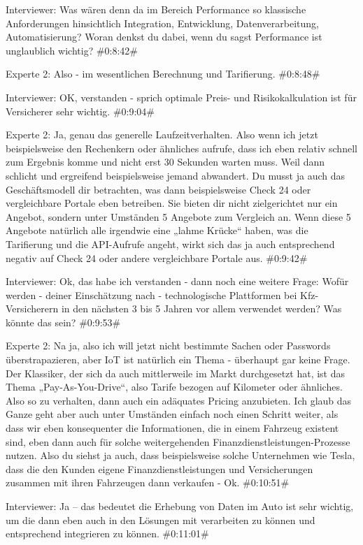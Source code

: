 Interviewer:
Was wären denn da im Bereich Performance so klassische Anforderungen hinsichtlich Integration, Entwicklung, Datenverarbeitung, Automatisierung? Woran denkst du dabei, wenn du sagst Performance ist unglaublich wichtig?
\#0:8:42\#

Experte 2:
Also - im wesentlichen Berechnung und Tarifierung.
\#0:8:48\#

Interviewer:
OK, verstanden - sprich optimale Preis- und Risikokalkulation ist für Versicherer sehr wichtig.
\#0:9:04\#

Experte 2:
Ja, genau das generelle Laufzeitverhalten. Also wenn ich jetzt beispielsweise den Rechenkern oder ähnliches aufrufe, dass ich eben relativ schnell zum Ergebnis komme und nicht erst 30 Sekunden warten muss. Weil dann schlicht und ergreifend beispielsweise jemand abwandert. Du musst ja auch das Geschäftsmodell dir betrachten, was dann beispielsweise Check 24 oder vergleichbare Portale eben betreiben. Sie bieten dir nicht zielgerichtet nur ein Angebot, sondern unter Umständen 5 Angebote zum Vergleich an. Wenn diese 5 Angebote natürlich alle irgendwie eine „lahme Krücke“ haben, was die Tarifierung und die API-Aufrufe angeht, wirkt sich das ja auch entsprechend negativ auf Check 24 oder andere vergleichbare Portale aus.
\#0:9:42\#

Interviewer:
Ok, das habe ich verstanden - dann noch eine weitere Frage: Wofür werden - deiner Einschätzung nach - technologische Plattformen bei Kfz-Versicherern in den nächsten 3 bis 5 Jahren vor allem verwendet werden? Was könnte das sein?
\#0:9:53\#

Experte 2:
Na ja, also ich will jetzt nicht bestimmte Sachen oder Passwords überstrapazieren, aber IoT ist natürlich ein Thema - überhaupt gar keine Frage. Der Klassiker, der sich da auch mittlerweile im Markt durchgesetzt hat, ist das Thema „Pay-As-You-Drive“, also Tarife bezogen auf Kilometer oder ähnliches. Also so zu verhalten, dann auch ein adäquates Pricing anzubieten. Ich glaub das Ganze geht aber auch unter Umständen einfach noch einen Schritt weiter, als dass wir eben konsequenter die Informationen, die in einem Fahrzeug existent sind, eben dann auch für solche weitergehenden Finanzdienstleistungen-Prozesse nutzen. Also du siehst ja auch, dass beispielsweise solche Unternehmen wie Tesla, dass die den Kunden eigene Finanzdienstleistungen und Versicherungen zusammen mit ihren Fahrzeugen dann verkaufen - Ok.
\#0:10:51\#

Interviewer:
Ja – das bedeutet die Erhebung von Daten im Auto ist sehr wichtig, um die dann eben auch in den Lösungen mit verarbeiten zu können und entsprechend integrieren zu können.
\#0:11:01\#


